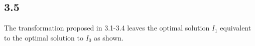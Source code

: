 \subsection*{3.5} 
The transformation proposed in 3.1-3.4 leaves the optimal solution $I_1$ equivalent to the optimal solution to $I_0$ as shown.
